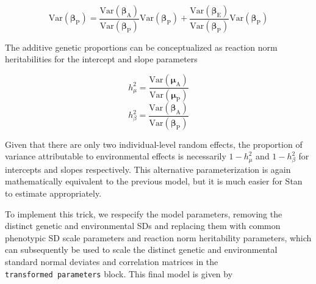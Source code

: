 \documentclass[
]{book}
\begin{document}
\[\mathrm{Var}(\boldsymbol{\beta_\mathrm{P}}) = 
\frac { \mathrm{Var}(\boldsymbol{\beta_{\mathrm{A}}}) }{\mathrm{Var}(\boldsymbol{\beta_{\mathrm{P}}})}\mathrm{Var}(\boldsymbol{\beta_\mathrm{P}}) + 
\frac { \mathrm{Var}(\boldsymbol{\beta_{\mathrm{E}}}) }{\mathrm{Var}(\boldsymbol{\beta_{\mathrm{P}}})}\mathrm{Var}(\boldsymbol{\beta_\mathrm{P}})\]

The additive genetic proportions can be conceptualized as reaction norm heritabilities for the intercept and slope parameters

\[h_{\mu}^{2} =\frac { \mathrm{Var}(\boldsymbol{\mu_{\mathrm{A}}}) }{\mathrm{Var}(\boldsymbol{\mu_{\mathrm{P}}})}\]
\[h_{\beta}^{2}=\frac { \mathrm{Var}(\boldsymbol{\beta_{\mathrm{A}}}) }{\mathrm{Var}(\boldsymbol{\beta_{\mathrm{P}}})}\]

Given that there are only two individual-level random effects, the proportion of variance attributable to environmental effects is necessarily \(1-h_{\mu}^{2}\) and \(1-h_{\beta}^{2}\) for intercepts and slopes respectively. This alternative parameterization is again mathematically equivalent to the previous model, but it is much easier for Stan to estimate appropriately.

To implement this trick, we respecify the model parameters, removing the distinct genetic and environmental SDs and replacing them with common phenotypic SD scale parameters and reaction norm heritability parameters, which can subsequently be used to scale the distinct genetic and environmental standard normal deviates and correlation matrices in the \texttt{transformed\ parameters} block. This final model is given by
\end{document}
